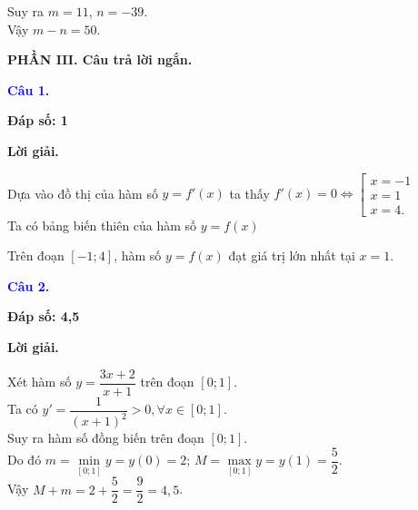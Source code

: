 \documentclass[12pt,a4paper]{article}
\begin{document}
			Suy ra $m=11$, $n=-39$.\\

			Vậy $m-n=50$.

\medskip
\noindent\textbf{PHẦN III. Câu trả lời ngắn.}

\medskip

\noindent\textcolor{blue}{\textbf{Câu 1.}}

\noindent \textbf{Đáp số: 1}

\noindent\textbf{Lời giải.}

Dựa vào đồ thị của hàm số $y=f'(x)$ ta thấy $f'(x)=0\Leftrightarrow \left[\begin{array}{l}x=-1 \\x=1 \\x=4.\end{array}\right.$\\

		Ta có bảng biến thiên của hàm số $y=f(x)$

		Trên đoạn $[-1;4]$, hàm số $y=f(x)$ đạt giá trị lớn nhất tại $x=1$.

\medskip
\noindent\textcolor{blue}{\textbf{Câu 2.}}

\noindent \textbf{Đáp số: 4,5}

\noindent\textbf{Lời giải.}

Xét hàm số $y=\dfrac{3x+2}{x+1}$ trên đoạn $[0;1]$.\\

		Ta có $y'=\dfrac{1}{(x+1)^2}>0, \forall x \in [0;1]$.\\

		Suy ra hàm số đồng biến trên đoạn $[0;1]$.\\

		Do đó $m=\min\limits_{[0;1]} y=y(0)=2$; $M=\max\limits_{[0;1]} y=y(1)=\dfrac{5}{2}$.\\

		Vậy $M+m=2+\dfrac{5}{2}=\dfrac{9}{2}=4,5$.

\medskip
\end{document}
